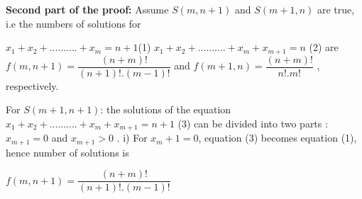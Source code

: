 \documentclass[11pt]{article}
\begin{document}
\noindent \textbf{Second part of the proof:} \newline \newline
\noindent  Assume $S(m,n+1)$ and $S(m+1,n)$ are true, i.e the numbers of solutions for \newline \newline

\noindent $x_1 + x_2 + .......... + x_m = n+1$\space \space \space \space \space \space \space \space \space \space \space (1) \newline \newline
$x_1 + x_2 + .......... + x_m + x_{m+1} = n$ \space \space \space \space \space (2) \newline \newline \newline
are $f(m,n+1) = \dfrac{(n+m)!}{(n+1)!.(m-1)!}$ and $f(m+1,n) = \dfrac{(n+m)!}{n!.m!}$ , respectively. \newline \newline


\noindent For $S(m+1,n+1)$: \newline \newline
the solutions of the equation \newline \newline
$x_1 + x_2 + .......... + x_m + x_{m+1} = n+1$ \space \space \space \space \space (3) \newline \newline
can be divided into two parts : $x_{m+1} = 0$ and $x_{m+1} > 0$ .
\noindent 
\newline \newline i) For $x_m+1 = 0$, equation (3) becomes equation (1), hence number of solutions is
\begin{center}
    $f(m,n+1) = \dfrac{(n+m)!}{(n+1)!.(m-1)!}$
\end{center}
\end{document}
